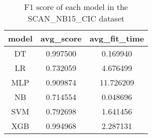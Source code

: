 \begin{table}[H]
\centering
\caption{F1 score of each model in the SCAN_NB15_CIC dataset}
\label{f1_valid_scan_nb15_cic}
\begin{tabular}{ccc}
\toprule
model &  avg\_score &  avg\_fit\_time \\
\midrule
   DT &   0.997500 &      0.169940 \\
   LR &   0.732059 &      4.676499 \\
  MLP &   0.909874 &     11.726209 \\
   NB &   0.714554 &      0.048696 \\
  SVM &   0.792698 &      1.641456 \\
  XGB &   0.994968 &      2.287131 \\
\bottomrule
\end{tabular}
\end{table}

